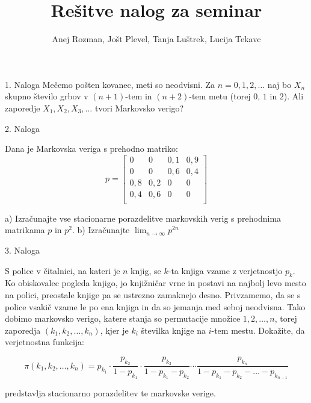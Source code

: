 \documentclass[]{beamer}
\title[Rešitve nalog]{Rešitve nalog za seminar}
\author[]{Anej Rozman, Jošt Plevel, Tanja Luštrek, Lucija Tekavc}
\institute[Mentor: doc. dr. Martin Raič]{Fakulteta za matematiko in fiziko}
\date[]{}
\begin{document}
\maketitle

\begin{frame}{1. Naloga}
    Mečemo pošten kovanec, meti so neodvisni. Za $n = 0, 1, 2, \ldots$ naj bo $X_n$ skupno število grbov v $(n + 1)$-tem in $(n + 2)$-tem metu (torej $0$, $1$ in $2$). Ali zaporedje $X_1, X_2, X_3, \ldots$ tvori Markovsko verigo?


\end{frame}



\begin{frame}{2. Naloga}

    Dana je Markovska veriga s prehodno matriko:
$$ p =
    \begin{bmatrix}
        0 & 0 & 0{,}1 & 0{,}9 \\
        0 & 0 & 0{,}6 & 0{,}4 \\
        0{,}8 & 0{,}2 & 0 & 0 \\
        0{,}4 & 0{,}6 & 0 & 0 \\
    \end{bmatrix}
$$       

a) Izračunajte vse stacionarne porazdelitve markovskih verig s prehodnima matrikama $p$ in $p^2$. \newline
b) Izračunajte $\lim_{n\to\infty} p^{2n}$

\end{frame}



\begin{frame}{3. Naloga}

    S police v čitalnici, na kateri je $n$ knjig, se $k$-ta knjiga vzame z verjetnostjo $p_k$. Ko
    obiskovalec pogleda knjigo, jo knjižničar vrne in postavi na najbolj levo mesto na polici,
    preostale knjige pa se ustrezno zamaknejo desno. Privzamemo, da se s police vsakič vzame
    le po ena knjiga in da so jemanja med seboj neodvisna. Tako dobimo markovsko verigo,
    katere stanja so permutacije množice ${1, 2, \ldots, n}$, torej zaporedja $(k_1, k_2, \ldots, k_n)$, kjer je
    $k_i$ številka knjige na $i$-tem mestu. Dokažite, da verjetnostna funkcija:

$$
\pi(k_1, k_2, \ldots, k_n) = p_{k_1} \cdot \dfrac{p_{k_2}}{1 - p_{k_1}} \cdot \dfrac{p_{k_3}}{1 - p_{k_1} - p_{k_2}} \cdots \dfrac{p_{k_n}}{1 - p_{k_1} - p_{k_2} - \ldots - p_{k_{n-1}}}
$$

predstavlja stacionarno porazdelitev te markovske verige.
\end{frame}
\end{document}
